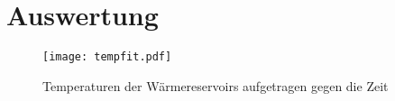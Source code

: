 \section{Auswertung}
\label{sec:Auswertung}

\begin{figure}
  \centering
  \texttt{[image: tempfit.pdf]}
  \caption{Temperaturen der Wärmereservoirs aufgetragen gegen die Zeit}
  \label{fig:tempfit}
\end{figure}
